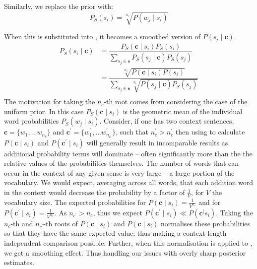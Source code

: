 \documentclass{sig-alternate}
\renewcommand{\c}{\mathbf{c}}
\newcommand{\s}{\mathbf{s}}
\begin{document}
Similarly, we replace the prior with:
\begin{equation} \label{eq:priorsmoothed}
P_S(s_{i})= \sqrt[n_c]{P(w_{j} \mid s_{i})}
\end{equation}


When this is substituted into , it becomes a smoothed version of $P(s_{i} \mid \c)$.
\begin{equation} \label{eq:generalwsdsmoothed}
\begin{aligned}
P_S(s_{i}\mid\c) %
&=\dfrac{P_{S}(\c\mid s_{i})P_S(s_{i})}
{\sum_{s_{j}\in\s} P_{S}(s_{j}\mid\c) P_S(s_{j})} \\
%
&=\dfrac{\sqrt[n_c]{P(\c\mid s_{i})P(s_{i})}}
{\sum_{s_{j}\in\s} \sqrt[n_c]{P(s_{j}\mid\c)P_S(s_{j})}} \\
%
\end{aligned}
\end{equation}
The motivation for taking the $n_c$-th root comes from considering the case of the uniform prior.
In this case $P_S(\c \mid s_{i})$ is the geometric mean of the individual word probabilities $P_S(w_j \mid s_{i})$.
Consider, if one has two context sentences, $\c=\{w_1,...w_{n_c}\}$ and $\c^\prime=\{w_1^\prime,...w^\prime_{n_{c^\prime}}\}$, such that $n_c^\prime > n_c^\prime$
then using  to calculate $P(\c \mid s_{i})$ and $P(\c^\prime \mid s_{i})$ will generally result in incomparable results as additional probability terms will dominate -- often significantly more than the the relative values of the probabilities themselves.
The number of words that can occur in the context of any given sense is very large -- a large portion of the vocabulary. We would expect, averaging across all words, that each addition word in the context would decrease the probability by a factor of $\frac{1}{V}$, for $V$ the vocabulary size. 
The expected probabilities for $P(\c \mid s_{i}) = \frac{1}{V^{n_c}}$ and for $P(\c^\prime \mid s_{i}) = \frac{1}{V^{n_{c^\prime}}}$. As $n_{c^\prime} > n_c$, thus we expect $P(\c^\prime \mid s_{i}) \ll P(\c^ \mid s_{i})$.
Taking the $n_{c}$-th and $n_{c^\prime}$-th roots of $P(\c \mid s_{i})$ and $P(\c \mid s_{i})$ normalises these probabilities so that they have the same expected value; thus making a context-length independent comparison possible.
Further, when this normalisation is applied to , we get a smoothing effect. Thus handling our issues with overly sharp posterior estimates.
\end{document}
